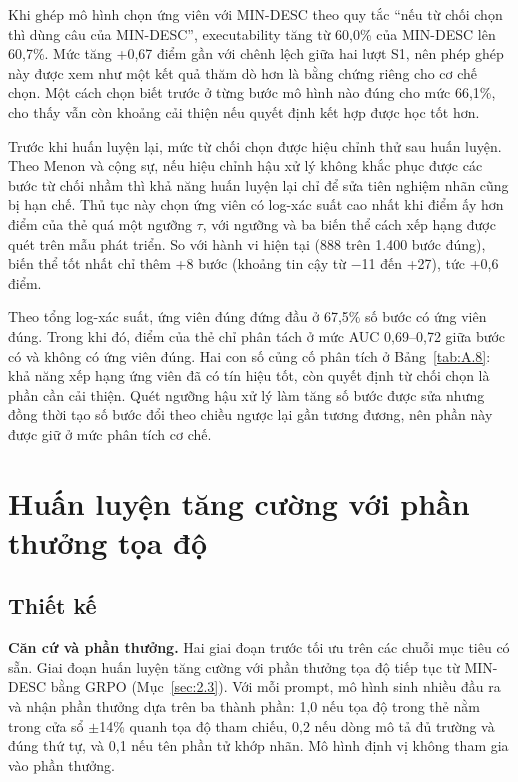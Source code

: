 Khi ghép mô hình chọn ứng viên với MIN-DESC theo quy tắc “nếu từ chối chọn thì dùng câu của MIN-DESC”, executability tăng từ 60,0\% của MIN-DESC lên 60,7\%. Mức tăng +0,67 điểm gần với chênh lệch giữa hai lượt S1, nên phép ghép này được xem như một kết quả thăm dò hơn là bằng chứng riêng cho cơ chế chọn. Một cách chọn biết trước ở từng bước mô hình nào đúng cho mức 66,1\%, cho thấy vẫn còn khoảng cải thiện nếu quyết định kết hợp được học tốt hơn.

Trước khi huấn luyện lại, mức từ chối chọn được hiệu chỉnh thử sau huấn luyện. Theo Menon và cộng sự, nếu hiệu chỉnh hậu xử lý không khắc phục được các bước từ chối nhầm thì khả năng huấn luyện lại chỉ để sửa tiên nghiệm nhãn cũng bị hạn chế. Thủ tục này chọn ứng viên có log-xác suất cao nhất khi điểm ấy hơn điểm của thẻ  quá một ngưỡng $\tau$, với ngưỡng và ba biến thể cách xếp hạng được quét trên mẫu phát triển. So với hành vi hiện tại (888 trên 1.400 bước đúng), biến thể tốt nhất chỉ thêm +8 bước (khoảng tin cậy từ $-$11 đến +27), tức +0,6 điểm.

Theo tổng log-xác suất, ứng viên đúng đứng đầu ở 67,5\% số bước có ứng viên đúng. Trong khi đó, điểm của thẻ  chỉ phân tách ở mức AUC 0,69--0,72 giữa bước có và không có ứng viên đúng. Hai con số củng cố phân tích ở Bảng~\ref{tab:A.8}: khả năng xếp hạng ứng viên đã có tín hiệu tốt, còn quyết định từ chối chọn là phần cần cải thiện. Quét ngưỡng hậu xử lý làm tăng số bước được sửa nhưng đồng thời tạo số bước đổi theo chiều ngược lại gần tương đương, nên phần này được giữ ở mức phân tích cơ chế.

\section{Huấn luyện tăng cường với phần thưởng tọa độ}\label{sec:A.4}

\subsection{Thiết kế}\label{sec:A.4.1}

\textbf{Căn cứ và phần thưởng.} Hai giai đoạn trước tối ưu trên các chuỗi mục tiêu có sẵn. Giai đoạn huấn luyện tăng cường với phần thưởng tọa độ tiếp tục từ MIN-DESC bằng GRPO (Mục~\ref{sec:2.3}). Với mỗi prompt, mô hình sinh nhiều đầu ra và nhận phần thưởng dựa trên ba thành phần: 1,0 nếu tọa độ trong thẻ  nằm trong cửa sổ $\pm$14\% quanh tọa độ tham chiếu, 0,2 nếu dòng mô tả đủ trường và đúng thứ tự, và 0,1 nếu tên phần tử khớp nhãn. Mô hình định vị không tham gia vào phần thưởng.


